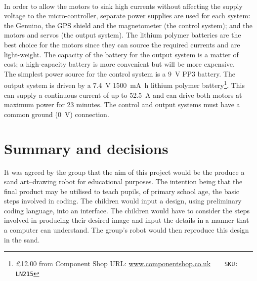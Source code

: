             \paragraph{}In order to allow the motors to sink high currents without affecting the supply voltage to the micro-controller, separate power supplies are used for each system: the \gls{Genuino}, the GPS shield and the \gls{magnetometer} (the control system); and the motors and \glspl{servo} (the output system). The lithium polymer batteries are the best choice for the motors since they can source the required currents and are light-weight. The capacity of the battery for the output system is a matter of cost; a high-capacity battery is more convenient but will be more expensive.\\
            The simplest power source for the control system is a \SI{9}{\volt} PP3 battery. The output system is driven by a \SI{7.4}{\volt} \SI{1500}{\milli\ampere\hour} lithium polymer battery\footnote{\pounds{12.00} from Component Shop \textsc{URL:} \url{www.componentshop.co.uk}~~~~\texttt{SKU: LN215}}. This can supply a continuous current of up to \SI{52.5}{\ampere} and can drive both motors at maximum power for 23 minutes. The control and output systems must have a common ground (\SI{0}{\volt}) connection.



\section{Summary and decisions}
    It was agreed by the group that the aim of this project would be the produce a sand art--drawing robot for educational purposes. The intention being that the final product may be utilised to teach pupils, of primary school age, the basic steps involved in coding.
    The children would input a design, using preliminary coding language, into an interface. The children would have to consider the steps involved in producing their desired image and input the details in a manner that a computer can understand. The group's robot would then reproduce this design in the sand. 







